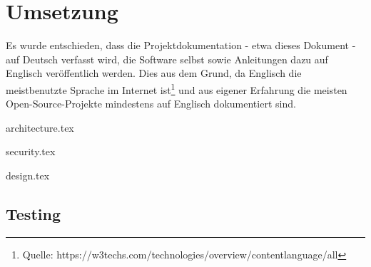 \begin{comment}
(Implementierung) Architektur und Design beschrieben: Mit begründeten Architekturentscheidungen, mit Diskussion, wie Qualitätsattribute sichergestellt wurden (welche Qualität wurde erreicht?), mit Dokumentation, welche Experimente/Tests durchgeführt wurden und welche Lösungsoptionen aufgrund der Ergebnisse dieser Experimente/Tests
verworfen wurden (was ging schief?)
\end{comment}

\chapter{Umsetzung}

Es wurde entschieden, dass die Projektdokumentation - etwa dieses Dokument - auf Deutsch verfasst wird, die Software selbst sowie Anleitungen dazu auf Englisch veröffentlich werden. Dies aus dem Grund, da Englisch die meistbenutzte Sprache im Internet ist\footnote{Quelle: https://w3techs.com/technologies/overview/content\textunderscore language/all} und aus eigener Erfahrung die meisten Open-Source-Projekte mindestens auf Englisch dokumentiert sind.

\xxx


{architecture.tex}

\clearpage
{security.tex}

\clearpage
{design.tex}

\clearpage
\section{Testing}

